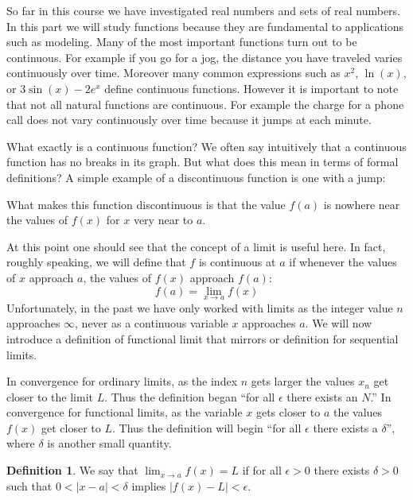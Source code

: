 \documentclass[11pt,oneside]{amsbook}
\theoremstyle{definition}
\theoremstyle{plain}
\theoremstyle{definition}
\newtheorem{defn}[thm]{Definition}
\theoremstyle{remark}
\numberwithin{equation}{section}
\numberwithin{figure}{section}
\begin{document}
So far in this course we have investigated real numbers and sets of real numbers. In this part we will study functions because they are fundamental to applications such as modeling. Many of the most important functions turn out to be continuous. For example if you go for a jog, the distance you have traveled varies continuously over time. Moreover many common expressions such as $x^2$, $\ln(x)$, or $3\sin(x)-2e^x$ define continuous functions. However it is important to note that not all natural functions are continuous. For example the charge for a phone call does not vary continuously over time because it jumps at each minute.

What exactly is a continuous function? We often say intuitively that a continuous function has no breaks in its graph. But what does this mean in terms of formal definitions? A simple example of a discontinuous function is one with a jump:
\begin{center}
\end{center}
What makes this function discontinuous is that the value $f(a)$ is nowhere near the values of $f(x)$ for $x$ very near to $a$.

At this point one should see that the concept of a limit is useful here. In fact, roughly speaking, we will define that $f$ is continuous at $a$ if whenever the values of $x$ approach $a$, the values of $f(x)$ approach $f(a)$:
\[f(a)=\lim_{x\to a}f(x)
\]
Unfortunately, in the past we have only worked with limits as the integer value $n$ approaches $\infty$, never as a continuous variable $x$ approaches $a$. We will now introduce a definition of functional limit that mirrors or definition for sequential limits.

In convergence for ordinary limits, as the index $n$ gets larger the values $x_n$ get closer to the limit $L$. Thus the definition began ``for all $\epsilon$ there exists an $N$.'' In convergence for functional limits, as the variable $x$ gets closer to $a$ the values $f(x)$ get closer to $L$. Thus the definition will begin ``for all $\epsilon$ there exists a $\delta$'', where $\delta$ is another small quantity.

\begin{defn}
  We say that $\lim_{x\to a}f(x)=L$ if for all $\epsilon>0$ there exists $\delta>0$ such that $0<|x-a|<\delta$ implies $|f(x)-L|<\epsilon$.
\end{defn}
\end{document}
